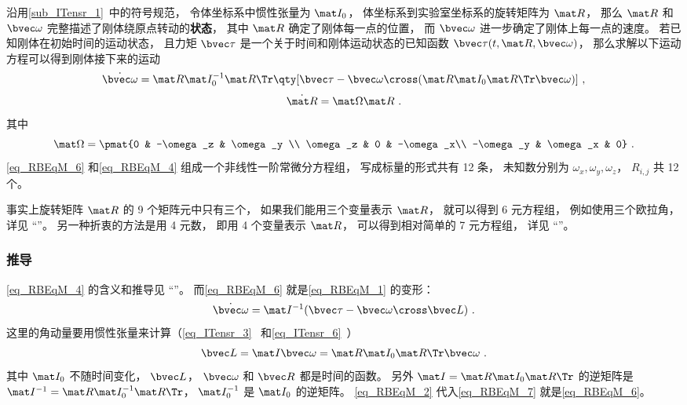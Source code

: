 沿用\autoref{sub_ITensr_1}~中的符号规范， 令体坐标系中惯性张量为 $\mat I_0$， 体坐标系到实验室坐标系的旋转矩阵为 $\mat R$， 那么 $\mat R$ 和 $\bvec \omega$ 完整描述了刚体绕原点转动的\textbf{状态}， 其中 $\mat R$ 确定了刚体每一点的位置， 而 $\bvec \omega$ 进一步确定了刚体上每一点的速度。 若已知刚体在初始时间的运动状态， 且力矩 $\bvec \tau$ 是一个关于时间和刚体运动状态的已知函数 $\bvec \tau(t, \mat R, \bvec\omega)$， 那么求解以下运动方程可以得到刚体接下来的运动
\begin{equation}\label{eq_RBEqM_6}
\dot{\bvec \omega} = \mat R \mat I_0^{-1} \mat R\Tr \qty[\bvec \tau  - \bvec\omega\cross(\mat R \mat I_0 \mat R\Tr \bvec\omega)]~,
\end{equation}
\begin{equation}\label{eq_RBEqM_4}
\dot{\mat R} = \mat\Omega \mat R~.
\end{equation}
其中
\begin{equation}\label{eq_RBEqM_5}
\mat\Omega = \pmat{0 & -\omega_z & \omega_y \\ \omega_z & 0 & -\omega_x\\ -\omega_y & \omega_x & 0}~.
\end{equation}
\autoref{eq_RBEqM_6} 和\autoref{eq_RBEqM_4} 组成一个非线性一阶常微分方程组， 写成标量的形式共有 12 条， 未知数分别为 $\omega_x, \omega_y, \omega_z$， $R_{i,j}$ 共 12 个。

事实上旋转矩阵 $\mat R$ 的 9 个矩阵元中只有三个， 如果我们能用三个变量表示 $\mat R$， 就可以得到 6 元方程组， 例如使用三个欧拉角， 详见 “”。 另一种折衷的方法是用 4 元数， 即用 4 个变量表示 $\mat R$， 可以得到相对简单的 7 元方程组， 详见 “”。

\subsubsection{推导}

\autoref{eq_RBEqM_4} 的含义和推导见 “”。 而\autoref{eq_RBEqM_6} 就是\autoref{eq_RBEqM_1} 的变形：
\begin{equation}\label{eq_RBEqM_7}
\dot{\bvec \omega} = \mat I^{-1} (\bvec\tau - \bvec\omega\cross\bvec L)~.
\end{equation}
这里的角动量要用惯性张量来计算（\autoref{eq_ITensr_3}~ 和\autoref{eq_ITensr_6}~）
\begin{equation}\label{eq_RBEqM_2}
\bvec L = \mat I \bvec \omega = \mat R \mat I_0 \mat R\Tr \bvec \omega~.
\end{equation}
其中 $\mat I_0$ 不随时间变化， $\bvec L$， $\bvec \omega$ 和 $\bvec R$ 都是时间的函数。 另外 $\mat I = \mat R \mat I_0 \mat R\Tr$ 的逆矩阵是 $\mat I^{-1} = \mat R \mat I_0^{-1} \mat R\Tr$， $\mat I_0^{-1}$ 是 $\mat I_0$ 的逆矩阵。 \autoref{eq_RBEqM_2} 代入\autoref{eq_RBEqM_7} 就是\autoref{eq_RBEqM_6}。

